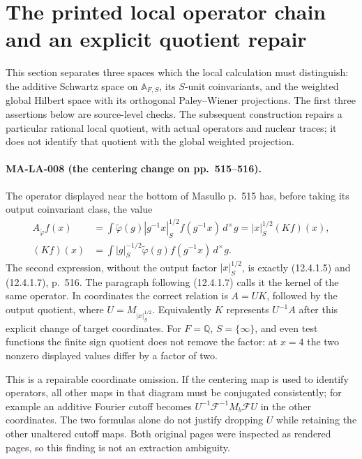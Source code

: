 \section{The printed local operator chain and an explicit quotient repair}
\label{sec:source-operator-audit}

This section separates three spaces which the local calculation must
distinguish: the additive Schwartz space on $\mathbb A_{F,S}$,
its $S$-unit coinvariants, and the weighted global Hilbert space
with its orthogonal Paley--Wiener projections.  The first three
assertions below are source-level checks.  The subsequent construction
repairs a particular rational local quotient, with actual operators
and nuclear traces; it does not identify that quotient with the
global weighted projection.

\paragraph{MA-LA-008 (the centering change on pp.~515--516).}
The operator displayed near the bottom of Masullo p.~515 has,
before taking its output coinvariant class, the value
\[
 \begin{aligned}
 A_{\widetilde\varphi}f(x)
  &=\int \widetilde\varphi(g)|g^{-1}x|_S^{1/2}
                     f(g^{-1}x)\,d^\times g
  =|x|_S^{1/2}(Kf)(x),\\
 (Kf)(x)&=\int |g|_S^{-1/2}\widetilde\varphi(g)
                     f(g^{-1}x)\,d^\times g .
 \end{aligned}
 \tag{MA-LA.39}
\]
The second expression, without the output factor $|x|_S^{1/2}$,
is exactly (12.4.1.5) and (12.4.1.7), p.~516.  The paragraph
following (12.4.1.7) calls it the kernel of the same operator.
In coordinates the correct relation is $A=UK$, followed by
the output quotient, where $U=M_{|x|_S^{1/2}}$.
Equivalently $K$ represents $U^{-1}A$ after this explicit
change of target coordinates.  For $F=\mathbb Q$, $S=\{\infty\}$,
and even test functions the finite sign quotient does not remove
the factor: at $x=4$ the two nonzero displayed values differ
by a factor of two.

This is a repairable coordinate omission.  If the centering map
is used to identify operators, all other maps in that diagram
must be conjugated consistently; for example an additive Fourier
cutoff becomes $U^{-1}\mathcal F^{-1}M_b\mathcal F U$ in the
other coordinates.  The two formulas alone do not justify dropping
$U$ while retaining the other unaltered cutoff maps.
Both original pages were inspected as rendered pages, so this
finding is not an extraction ambiguity.

